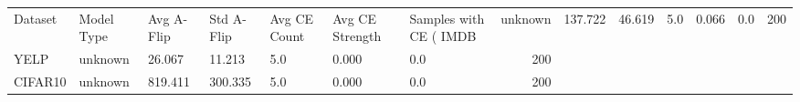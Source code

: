 \begin{tabular}{lllllllr}
\toprule
Dataset & Model Type & Avg A-Flip & Std A-Flip & Avg CE Count & Avg CE Strength & Samples with CE (%
\midrule
IMDB & unknown & 137.722 & 46.619 & 5.0 & 0.066 & 0.0 & 200 \\
YELP & unknown & 26.067 & 11.213 & 5.0 & 0.000 & 0.0 & 200 \\
CIFAR10 & unknown & 819.411 & 300.335 & 5.0 & 0.000 & 0.0 & 200 \\
\bottomrule
\end{tabular}
